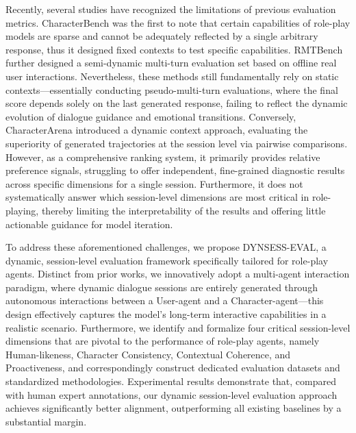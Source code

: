 Recently, several studies have recognized the limitations of previous evaluation metrics. CharacterBench \cite{wang-etal-2024-rolellm} was the first to note that certain capabilities of role-play models are sparse and cannot be adequately reflected by a single arbitrary response, thus it designed fixed contexts to test specific capabilities. RMTBench \cite{xiang-etal-2025-rmtbench} further designed a semi-dynamic multi-turn evaluation set based on offline real user interactions. Nevertheless, these methods still fundamentally rely on static contexts—essentially conducting pseudo-multi-turn evaluations, where the final score depends solely on the last generated response, failing to reflect the dynamic evolution of dialogue guidance and emotional transitions. Conversely, CharacterArena \cite{ye-etal-2025-cpo} introduced a dynamic context approach, evaluating the superiority of generated trajectories at the session level via pairwise comparisons. However, as a comprehensive ranking system, it primarily provides relative preference signals, struggling to offer independent, fine-grained diagnostic results across specific dimensions for a single session. Furthermore, it does not systematically answer which session-level dimensions are most critical in role-playing, thereby limiting the interpretability of the results and offering little actionable guidance for model iteration.

To address these aforementioned challenges, we propose DYNSESS-EVAL, a dynamic, session-level evaluation framework specifically tailored for role-play agents. Distinct from prior works, we innovatively adopt a multi-agent interaction paradigm, where dynamic dialogue sessions are entirely generated through autonomous interactions between a User-agent and a Character-agent—this design effectively captures the model’s long-term interactive capabilities in a realistic scenario. Furthermore, we identify and formalize four critical session-level dimensions that are pivotal to the performance of role-play agents, namely Human-likeness, Character Consistency, Contextual Coherence, and Proactiveness, and correspondingly construct dedicated evaluation datasets and standardized methodologies. Experimental results demonstrate that, compared with human expert annotations, our dynamic session-level evaluation approach achieves significantly better alignment, outperforming all existing baselines by a substantial margin.

